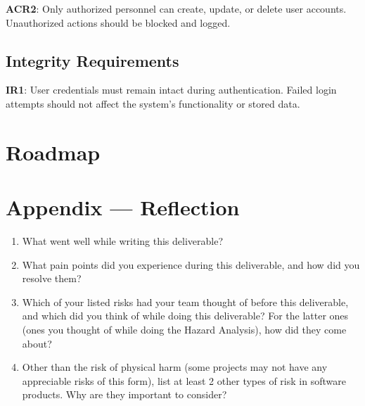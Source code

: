 \documentclass{article}
\begin{document}
\noindent \textbf{ACR2}: Only authorized personnel can create, update, or delete user accounts. Unauthorized actions should be blocked and logged.

\subsection{Integrity Requirements}
\textbf{IR1}: User credentials must remain intact during authentication. Failed login attempts should not affect the system's functionality or stored data.

\section{Roadmap}


\newpage{}

\section*{Appendix --- Reflection}




\begin{enumerate}
    \item What went well while writing this deliverable? 
    \item What pain points did you experience during this deliverable, and how
    did you resolve them?
    \item Which of your listed risks had your team thought of before this
    deliverable, and which did you think of while doing this deliverable? For
    the latter ones (ones you thought of while doing the Hazard Analysis), how
    did they come about?
    \item Other than the risk of physical harm (some projects may not have any
    appreciable risks of this form), list at least 2 other types of risk in
    software products. Why are they important to consider?
\end{enumerate}
\end{document}
